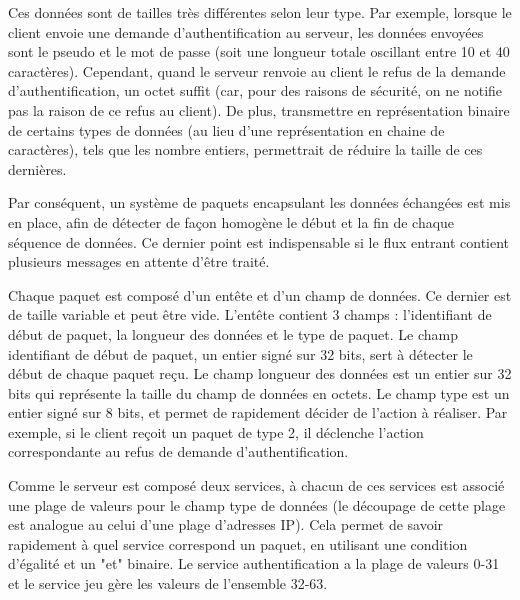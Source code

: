 \documentclass[11pt, a4paper]{report}
\begin{document}
      Ces données sont de tailles très différentes selon leur type. Par exemple, lorsque le client envoie une demande d'authentification au serveur, les données envoyées sont le pseudo et 
      le mot de passe (soit une longueur totale oscillant entre 10 et 40 caractères).
      Cependant, quand le serveur renvoie au client le refus de la demande d'authentification, un octet suffit (car, pour des raisons de sécurité, on ne notifie pas la raison de ce refus au client).
      De plus, transmettre en représentation binaire de certains types de données (au lieu d'une représentation en chaine de caractères), tels que les nombre entiers, permettrait de réduire la taille
      de ces dernières.
      \newline
      
      Par conséquent, un système de paquets encapsulant les données échangées est mis en place, afin de détecter de façon homogène le début et la fin de chaque séquence de données.
      Ce dernier point est indispensable si le flux entrant contient plusieurs messages en attente d'être traité.
      \newline
      
      Chaque paquet est composé d'un entête et d'un champ de données. Ce dernier est de taille variable et peut être vide.
      L'entête contient 3 champs : l'identifiant de début de paquet, la longueur des données et le type de paquet. Le champ identifiant de début de paquet, un entier signé sur 32 bits,
      sert à détecter le début de chaque paquet reçu.
      Le champ longueur des données est un entier sur 32 bits qui représente la taille du champ de données en octets.
      Le champ type est un entier signé sur 8 bits, et permet de rapidement décider de l'action à réaliser.
      Par exemple, si le client reçoit un paquet de type 2, il déclenche l'action correspondante au refus de demande d'authentification.
      \newline
      
      Comme le serveur est composé deux services, à chacun de ces services est associé une plage de valeurs pour le champ type de données (le découpage de cette plage 
      est analogue au celui d'une plage d'adresses IP).
      Cela permet de savoir rapidement à quel service correspond un paquet, en utilisant une condition d'égalité et un "et" binaire.
      Le service authentification a la plage de valeurs 0-31 et le service jeu gère les valeurs de l'ensemble 32-63.
      \newline
      
\end{document}
